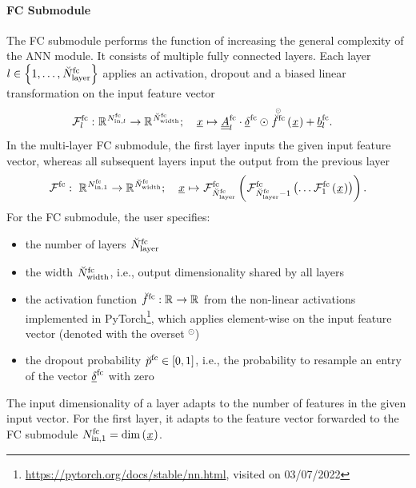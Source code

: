 \paragraph*{FC Submodule}$\ $\\
The FC submodule performs the function
of increasing the general complexity of the ANN module.
It consists of multiple fully connected layers.
Each layer 
$ l \in \setOfInts{1, \dots, \fcLayer}$ 
applies
an activation, 
dropout
and a biased linear transformation
on the input feature vector
\begin{align} \label{eq:fc_layer}
    \fcMap{l}
    :\ &
    \R{\fcIn{l}} \rightarrow \R{\fcOut}
    ;\quad 
    \featvec[]{}{}{}{} \mapsto
    \fcMat{l} \cdot \fcDropout \odot
    \hadfct{\fcAct} \left(\featvec[]{}{}{}{}\right)
    + \fcBias{l}
    .
\end{align}
In the multi-layer FC submodule, the first layer inputs 
the given input feature vector,
whereas all subsequent layers input the output from the previous layer
\begin{align} \label{eq:fc}
    \fcMap{}
    :\
    \R{\fcIn{1}} \rightarrow \R{\fcOut}
    ;\quad 
    \featvec[]{}{}{}{} \mapsto
    \fcMap{\fcLayer} \tuple{
        \fcMap{\fcLayer - 1} \tuple{
            \dots \fcMap{1} \tuple{
                \featvec[]{}{}{}{}
            }
        }    
    }
    .
\end{align}
For the FC submodule,
the user specifies:
\begin{itemize}
    \item the number of layers $\fcLayer$
    \item the width $\fcOut$, i.e., output dimensionality shared by all layers
    \item the activation function $\fcAct : \R{} \rightarrow \R{}$
    from the non-linear activations implemented in PyTorch\footnote{
        \url{https://pytorch.org/docs/stable/nn.html}, visited on 03/07/2022
    },
    which applies element-wise on the input feature vector (denoted with the overset ${}^\odot$)
    \item the dropout probability $\fcDropoutProb \in \setR{0,1}$,
    i.e., the probability to resample an entry of the vector 
    $\fcDropout$ with zero
    
    
\end{itemize}
The input dimensionality of a layer
adapts to the number of features in the given input vector.
For the first layer, it adapts to the feature vector
forwarded to the FC submodule
$\fcIn{1} = \dim \left(\featvec[]{}{}{}{}\right)$.
